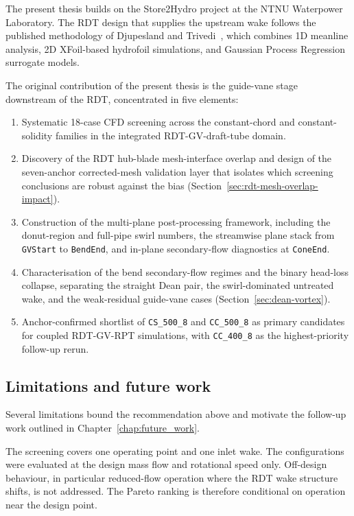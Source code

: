 The present thesis builds on the Store2Hydro project at the NTNU Waterpower Laboratory. The RDT design that supplies the upstream wake follows the published methodology of Djupesland and Trivedi~\cite{DjupeslandTrivedi2025}, which combines 1D meanline analysis, 2D XFoil-based hydrofoil simulations, and Gaussian Process Regression surrogate models.

The original contribution of the present thesis is the guide-vane stage downstream of the RDT, concentrated in five elements:

\begin{enumerate}
\item Systematic 18-case CFD screening across the constant-chord and constant-solidity families in the integrated RDT-GV-draft-tube domain.
\item Discovery of the RDT hub-blade mesh-interface overlap and design of the seven-anchor corrected-mesh validation layer that isolates which screening conclusions are robust against the bias (Section~\ref{sec:rdt-mesh-overlap-impact}).
\item Construction of the multi-plane post-processing framework, including the donut-region and full-pipe swirl numbers, the streamwise plane stack from \texttt{GVStart} to \texttt{BendEnd}, and in-plane secondary-flow diagnostics at \texttt{ConeEnd}.
\item Characterisation of the bend secondary-flow regimes and the binary head-loss collapse, separating the straight Dean pair, the swirl-dominated untreated wake, and the weak-residual guide-vane cases (Section~\ref{sec:dean-vortex}).
\item Anchor-confirmed shortlist of \texttt{CS\_500\_8} and \texttt{CC\_500\_8} as primary candidates for coupled RDT-GV-RPT simulations, with \texttt{CC\_400\_8} as the highest-priority follow-up rerun.
\end{enumerate}

\subsection{Limitations and future work}
\label{sec:limitations}

Several limitations bound the recommendation above and motivate the follow-up work outlined in Chapter~\ref{chap:future_work}.

The screening covers one operating point and one inlet wake. The configurations were evaluated at the design mass flow and rotational speed only. Off-design behaviour, in particular reduced-flow operation where the RDT wake structure shifts, is not addressed. The Pareto ranking is therefore conditional on operation near the design point.

